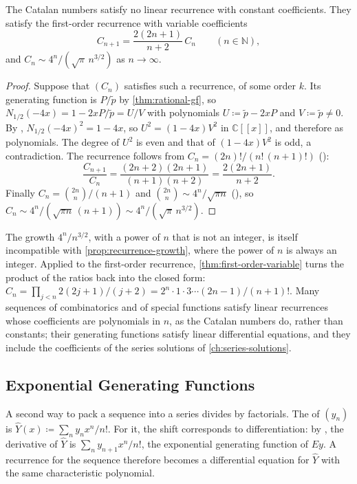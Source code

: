 \begin{proposition}
\label{prop:catalan-no-recurrence}
The Catalan numbers satisfy no linear recurrence with constant coefficients. They satisfy the first-order recurrence with variable coefficients
\[
C_{n+1}=\frac{2(2n+1)}{n+2}\,C_n\qquad(n\in\mathbb N),
\]
and $C_n\sim4^n/(\sqrt\pi\,n^{3/2})$ as $n\to\infty$.
\end{proposition}

\begin{proof}
Suppose that $(C_n)$ satisfies such a recurrence, of some order $k$. Its generating function is $P/\tilde p$ by \cref{thm:rational-gf}, so $N_{1/2}(-4x)=1-2xP/\tilde p=U/V$ with polynomials $U\coloneqq\tilde p-2xP$ and $V\coloneqq\tilde p\ne0$. By , $N_{1/2}(-4x)^2=1-4x$, so $U^2=(1-4x)V^2$ in $\mathbb C[[x]]$, and therefore as polynomials. The degree of $U^2$ is even and that of $(1-4x)V^2$ is odd, a contradiction. The recurrence follows from $C_n=(2n)!/(n!\,(n+1)!)$ ():
\[
\frac{C_{n+1}}{C_n}=\frac{(2n+2)(2n+1)}{(n+1)(n+2)}=\frac{2(2n+1)}{n+2} .
\]
Finally $C_n=\binom{2n}n/(n+1)$ and $\binom{2n}n\sim4^n/\sqrt{\pi n}$ (), so $C_n\sim4^n/(\sqrt{\pi n}\,(n+1))\sim4^n/(\sqrt\pi\,n^{3/2})$.
\end{proof}

The growth $4^n/n^{3/2}$, with a power of $n$ that is not an integer, is itself incompatible with \cref{prop:recurrence-growth}, where the power of $n$ is always an integer. Applied to the first-order recurrence, \cref{thm:first-order-variable} turns the product of the ratios back into the closed form: $C_n=\prod_{j<n}2(2j+1)/(j+2)=2^n\cdot1\cdot3\cdots(2n-1)/(n+1)!$. Many sequences of combinatorics and of special functions satisfy linear recurrences whose coefficients are polynomials in $n$, as the Catalan numbers do, rather than constants; their generating functions satisfy linear differential equations, and they include the coefficients of the series solutions of \cref{ch:series-solutions}.

\subsection{Exponential Generating Functions}

A second way to pack a sequence into a series divides by factorials. The  of $(y_n)$ is $\hat Y(x)\coloneqq\sum_ny_nx^n/n!$. For it, the shift corresponds to differentiation: by , the derivative of $\hat Y$ is $\sum_ny_{n+1}x^n/n!$, the exponential generating function of $Ey$. A recurrence for the sequence therefore becomes a differential equation for $\hat Y$ with the same characteristic polynomial.

